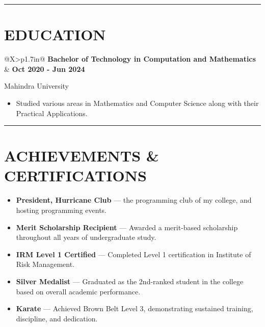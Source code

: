 \documentclass[8pt,a4paper]{article}
\newcommand{\sectionrule}{\noindent\textcolor{resumePurple}{\rule{\linewidth}{0.6pt}}\vspace{1pt}}
\begin{document}
\sectionrule
\section*{EDUCATION}
\begin{tabularx}{\linewidth}{@{}X>{\raggedleft\arraybackslash}p{1.7in}@{}}
    \textbf{Bachelor of Technology in Computation and Mathematics} & \textbf{Oct 2020 - Jun 2024}
\end{tabularx}
Mahindra University
\begin{itemize}
    \item Studied various areas in Mathematics and Computer Science along with their Practical Applications.
\end{itemize}

\sectionrule
\section*{ACHIEVEMENTS \& CERTIFICATIONS}
\begin{itemize}
    \item \textbf{President, Hurricane Club} — the programming club of my college, and hosting programming events.
    \item \textbf{Merit Scholarship Recipient} — Awarded a merit-based scholarship throughout all years of undergraduate study.
    \item \textbf{IRM Level 1 Certified} — Completed Level 1 certification in Institute of Risk Management.
    \item \textbf{Silver Medalist} — Graduated as the 2nd-ranked student in the college based on overall academic performance.
    \item \textbf{Karate} — Achieved Brown Belt Level 3, demonstrating sustained training, discipline, and dedication.
\end{itemize}
\end{document}
